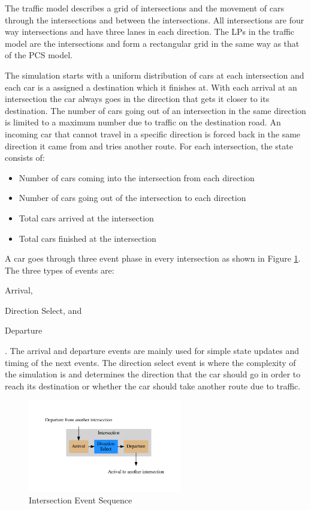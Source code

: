 \documentclass[11pt]{book}
\begin{document}
The traffic model describes a grid of intersections and the movement of cars through
the intersections and between the intersections.  All intersections are four way intersections
and have three lanes in each direction.  The LPs in the traffic model are the intersections
and form a rectangular grid in the same way as that of the PCS model.

The simulation starts with a uniform distribution of cars at each intersection and each
car is a assigned a destination which it finishes at.  With each arrival at an intersection
the car always goes in the direction that gets it closer to its destination.
The number of cars going out of an intersection in the same direction is limited to a
maximum number due to traffic on the destination road.  An incoming car that cannot travel in
a specific direction is forced back in the same direction it came from and tries another
route.  For each intersection, the state consists of:

\begin{itemize}
    \item Number of cars coming into the intersection from each direction
    \item Number of cars going out of the intersection to each direction
    \item Total cars arrived at the intersection
    \item Total cars finished at the intersection
\end{itemize}

A car goes through three event phase in every intersection as shown in Figure
\ref{traffic_events}.  The three types of events are: \begin{inparaenum}[(1)] \item Arrival,
\item Direction Select, and \item Departure \end{inparaenum}.  The arrival and departure
events are mainly used for simple state updates and timing of the next events.
The direction select event is where the complexity of the simulation is and determines the
direction that the car should go in order to reach its destination or whether the car should
take another route due to traffic.

\begin{figure}
    \centering
    \includegraphics[width=0.6\textwidth,quiet]{figs/graphviz/traffic_events.pdf}
    \caption{Intersection Event Sequence}\label{traffic_events}
\end{figure}
\end{document}
